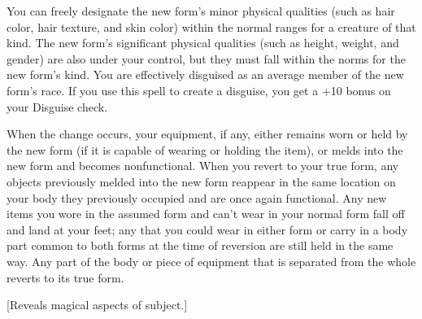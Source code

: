 {	You can freely designate the new form's minor physical qualities (such as hair color, hair texture, and skin color) within the normal ranges for a creature of that kind. The new form's significant physical qualities (such as height, weight, and gender) are also under your control, but they must fall within the norms for the new form's kind. You are effectively disguised as an average member of the new form's race. If you use this spell to create a disguise, you get a +10 bonus on your Disguise check.


	When the change occurs, your equipment, if any, either remains worn or held by the new form (if it is capable of wearing or holding the item), or melds into the new form and becomes nonfunctional. When you revert to your true form, any objects previously melded into the new form reappear in the same location on your body they previously occupied and are once again functional. Any new items you wore in the assumed form and can't wear in your normal form fall off and land at your feet; any that you could wear in either form or carry in a body part common to both forms at the time of reversion are still held in the same way. Any part of the body or piece of equipment that is separated from the whole reverts to its true form.
}
        
[Reveals magical aspects of subject.]
        
